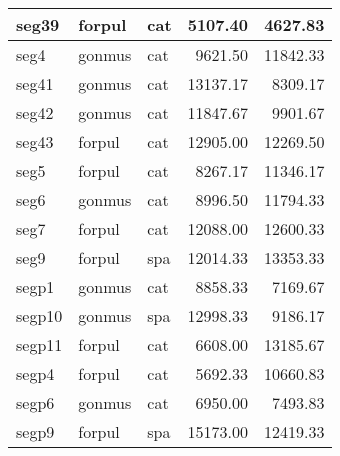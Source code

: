 \begin{appendix}
\begin{tabular}{l|l|l|r|r}
\hline
seg39 & forpul & cat & 5107.40 & 4627.83\\
\hline
seg4 & gonmus & cat & 9621.50 & 11842.33\\
\hline
seg41 & gonmus & cat & 13137.17 & 8309.17\\
\hline
seg42 & gonmus & cat & 11847.67 & 9901.67\\
\hline
seg43 & forpul & cat & 12905.00 & 12269.50\\
\hline
seg5 & forpul & cat & 8267.17 & 11346.17\\
\hline
seg6 & gonmus & cat & 8996.50 & 11794.33\\
\hline
seg7 & forpul & cat & 12088.00 & 12600.33\\
\hline
seg9 & forpul & spa & 12014.33 & 13353.33\\
\hline
segp1 & gonmus & cat & 8858.33 & 7169.67\\
\hline
segp10 & gonmus & spa & 12998.33 & 9186.17\\
\hline
segp11 & forpul & cat & 6608.00 & 13185.67\\
\hline
segp4 & forpul & cat & 5692.33 & 10660.83\\
\hline
segp6 & gonmus & cat & 6950.00 & 7493.83\\
\hline
segp9 & forpul & spa & 15173.00 & 12419.33\\
\hline
\end{tabular}
\end{appendix}
